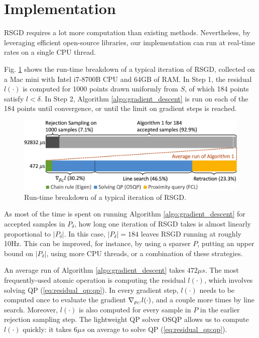 \section{Implementation}
RSGD requires a lot more computation than existing methods. Nevertheless, by leveraging efficient open-source libraries, our implementation can run at real-time rates on a single CPU thread.

Fig. \ref{fig:run_time} shows the run-time breakdown of a typical iteration of RSGD, collected on a Mac mini with Intel i7-8700B CPU and 64GB of RAM. In Step 1, the residual $l(\cdot)$ is computed for 1000 points drawn uniformly from $S$, of which 184 points satisfy $l < \delta$. In Step 2, Algorithm \ref{algo:gradient_descent} is run on each of the 184 points until convergence, or until the limit on gradient steps is reached.
\begin{figure}[h]
\centering
\includegraphics[width=0.95\linewidth]{figures/05_force_from_torque/run_time.png}
\caption{Run-time breakdown of a typical iteration of RSGD.}
\label{fig:run_time}
\end{figure}

As most of the time is spent on running Algorithm \ref{algo:gradient_descent} for accepted samples in $P_\delta$, how long one iteration of RSGD takes is almost linearly proportional to $|P_\delta|$. In this case, $|P_\delta|=184$ leaves RSGD running at roughly 10Hz. This can be improved, for instance, by using a sparser $P$, putting an upper bound on $|P_\delta|$, using more CPU threads, or a combination of these strategies. 

An average run of Algorithm \ref{algo:gradient_descent} takes $472 \mu s$. The most frequently-used atomic operation is computing the residual $l(\cdot)$, which involves solving QP (\ref{eq:residual_qp:qp}). In every gradient step, $l(\cdot)$ needs to be computed once to evaluate the gradient $\nabla_{p_{C}} l(\cdot)$, and a couple more times by line search. Moreover, $l(\cdot)$ is also computed for every sample in $P$ in the earlier rejection sampling step. The lightweight QP solver OSQP\cite{stellato2020osqp} allows us to compute $l(\cdot)$ quickly: it takes $6\mu s$ on average to solve QP (\ref{eq:residual_qp:qp}). 

